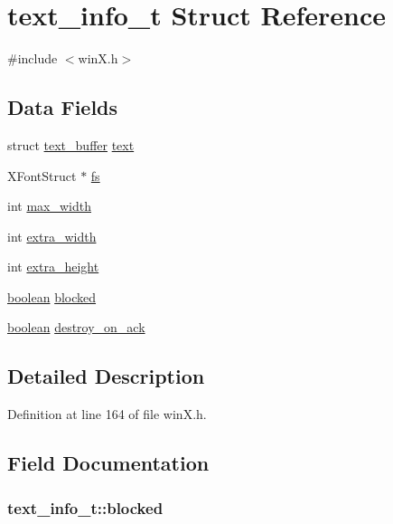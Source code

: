 \hypertarget{structtext__info__t}{\section{text\+\_\+info\+\_\+t Struct Reference}
\label{structtext__info__t}
}


{\ttfamily \#include $<$win\+X.\+h$>$}

\subsection*{Data Fields}
\begin{DoxyCompactItemize}
\item 
struct \hyperlink{structtext__buffer}{text\+\_\+buffer} \hyperlink{structtext__info__t_a5f680972356bbaddd025996082d0c389}{text}
\item 
X\+Font\+Struct $\ast$ \hyperlink{structtext__info__t_aca6a8ac387270498884c09d6ca405ed0}{fs}
\item 
int \hyperlink{structtext__info__t_a2c55a95fd96aa06a6a2910929affdb92}{max\+\_\+width}
\item 
int \hyperlink{structtext__info__t_a849d2019f93623095ae8f4134a2ffd77}{extra\+\_\+width}
\item 
int \hyperlink{structtext__info__t_ad80f9412dbbf0aed0f1093b6097d4c63}{extra\+\_\+height}
\item 
\hyperlink{global_8h_a531b10dd351aa162d7dcccd1966308b8}{boolean} \hyperlink{structtext__info__t_a95cb312644df31bee2bc628a30096525}{blocked}
\item 
\hyperlink{global_8h_a531b10dd351aa162d7dcccd1966308b8}{boolean} \hyperlink{structtext__info__t_a69f8614343afa947cebede852bbb74a6}{destroy\+\_\+on\+\_\+ack}
\end{DoxyCompactItemize}


\subsection{Detailed Description}


Definition at line 164 of file win\+X.\+h.



\subsection{Field Documentation}
\hypertarget{structtext__info__t_a95cb312644df31bee2bc628a30096525}{
\subsubsection[{blocked}]{ text\+\_\+info\+\_\+t\+::blocked}}\label{structtext__info__t_a95cb312644df31bee2bc628a30096525}


